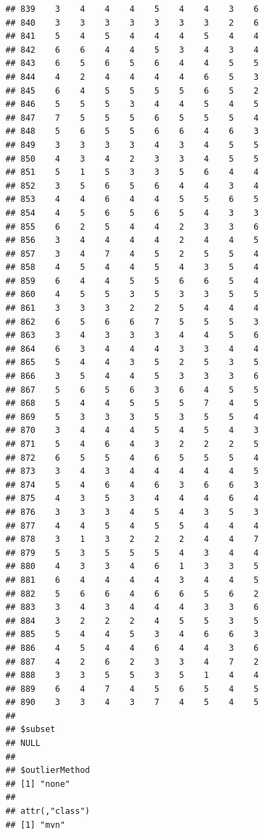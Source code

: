 \documentclass[
]{article}
\begin{document}
\begin{verbatim}
## 839    3    4    4    4    5    4    4    3    6
## 840    3    3    3    3    3    3    3    2    6
## 841    5    4    5    4    4    4    5    4    4
## 842    6    6    4    4    5    3    4    3    4
## 843    6    5    6    5    6    4    4    5    5
## 844    4    2    4    4    4    4    6    5    3
## 845    6    4    5    5    5    5    6    5    2
## 846    5    5    5    3    4    4    5    4    5
## 847    7    5    5    5    6    5    5    5    4
## 848    5    6    5    5    6    6    4    6    3
## 849    3    3    3    3    4    3    4    5    5
## 850    4    3    4    2    3    3    4    5    5
## 851    5    1    5    3    3    5    6    4    4
## 852    3    5    6    5    6    4    4    3    4
## 853    4    4    6    4    4    5    5    6    5
## 854    4    5    6    5    6    5    4    3    3
## 855    6    2    5    4    4    2    3    3    6
## 856    3    4    4    4    4    2    4    4    5
## 857    3    4    7    4    5    2    5    5    4
## 858    4    5    4    4    5    4    3    5    4
## 859    6    4    4    5    5    6    6    5    4
## 860    4    5    5    3    5    3    3    5    5
## 861    3    3    3    2    2    5    4    4    4
## 862    6    5    6    6    7    5    5    5    3
## 863    3    4    3    3    3    4    4    5    6
## 864    6    3    4    4    4    3    3    4    4
## 865    5    4    4    3    5    2    5    3    5
## 866    3    5    4    4    5    3    3    3    6
## 867    5    6    5    6    3    6    4    5    5
## 868    5    4    4    5    5    5    7    4    5
## 869    5    3    3    3    5    3    5    5    4
## 870    3    4    4    4    5    4    5    4    3
## 871    5    4    6    4    3    2    2    2    5
## 872    6    5    5    4    6    5    5    5    4
## 873    3    4    3    4    4    4    4    4    5
## 874    5    4    6    4    6    3    6    6    3
## 875    4    3    5    3    4    4    4    6    4
## 876    3    3    3    4    5    4    3    5    3
## 877    4    4    5    4    5    5    4    4    4
## 878    3    1    3    2    2    2    4    4    7
## 879    5    3    5    5    5    4    3    4    4
## 880    4    3    3    4    6    1    3    3    5
## 881    6    4    4    4    4    3    4    4    5
## 882    5    6    6    4    6    6    5    6    2
## 883    3    4    3    4    4    4    3    3    6
## 884    3    2    2    2    4    5    5    3    5
## 885    5    4    4    5    3    4    6    6    3
## 886    4    5    4    4    6    4    4    3    6
## 887    4    2    6    2    3    3    4    7    2
## 888    3    3    5    5    3    5    1    4    4
## 889    6    4    7    4    5    6    5    4    5
## 890    3    3    4    3    7    4    5    4    5
## 
## $subset
## NULL
## 
## $outlierMethod
## [1] "none"
## 
## attr(,"class")
## [1] "mvn"
\end{verbatim}
\end{document}
